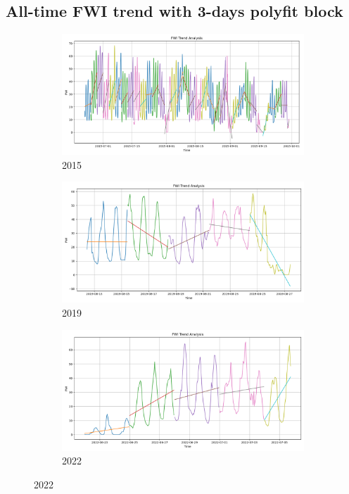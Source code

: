 \subsection{All-time FWI trend with 3-days polyfit block}
\begin{figure}[h]
	\centering
	\caption{All-time FWI polyfit trend}
	\begin{subfigure}{0.3\textwidth}
		\centering
		\includegraphics[width=\textwidth]{graphs/polyfit_trend_analysis/2015_BLOCK3days_FWI_trend_analysis.png}
		\caption{2015}
		\label{fig:2015_polyfit_fwi_alltime}
	\end{subfigure}
	\hfill
	\begin{subfigure}{0.3\textwidth}
		\centering
		\includegraphics[width=\textwidth]{graphs/polyfit_trend_analysis/2019_15days_BLOCK3days_FWI_trend_analysis.png}
		\caption{2019}
		\label{fig:2019_polyfit_fwi_alltime}
	\end{subfigure}
	\hfill
	\begin{subfigure}{0.3\textwidth}
		\centering
		\includegraphics[width=\textwidth]{graphs/polyfit_trend_analysis/2022_15days_BLOCK3days_FWI_trend_analysis.png}
		\caption{2022}
		\label{fig:2022_polyfit_fwi_alltime}
	\end{subfigure}
	\label{fig:fwi_polyfit_alltime}
\end{figure}

